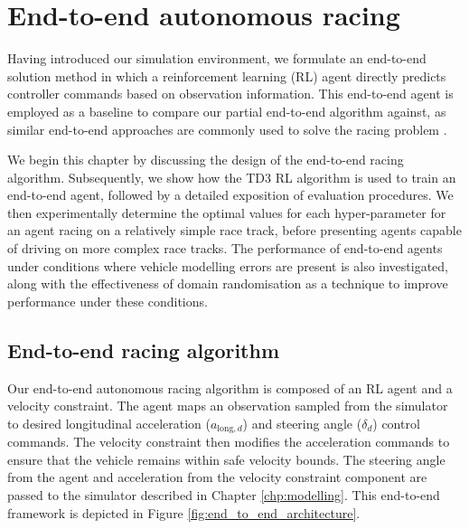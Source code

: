 \chapter{End-to-end autonomous racing}\label{chp:end_to_end_autonomous_racing}

Having introduced our simulation environment, 
we formulate an end-to-end solution method in which a reinforcement learning (RL) agent directly predicts controller commands based on observation information. 
This end-to-end agent is employed as a baseline to compare our partial end-to-end algorithm against, 
as similar end-to-end approaches are commonly used to solve the racing problem \cite{Song2021, Ivanov2020, hsu2022, Schwarting2021, Jaritz2018, Perot2017, Fuchs2021, Niu2020, Remonda2021, Chisari2021, brunnbauer2021}. 

We begin this chapter by discussing the design of the end-to-end racing algorithm.
Subsequently, we show how the TD3 RL algorithm is used to train an end-to-end agent, followed by a detailed exposition of evaluation procedures. 
We then experimentally determine the optimal values for each hyper-parameter for an agent racing on a relatively simple race track, before presenting agents
capable of driving on more complex race tracks.
The performance of end-to-end agents under conditions where vehicle modelling errors are present is also investigated, along with the effectiveness of
domain randomisation as a technique to improve performance under these conditions.






\section{End-to-end racing algorithm}\label{sec:end-to-end_design}

Our end-to-end autonomous racing algorithm is composed of an RL agent and a velocity constraint.
The agent maps an observation sampled from the simulator to desired longitudinal acceleration ($a_{\text{long},d}$) and steering angle ($\delta_d$) control commands.
The velocity constraint then modifies the acceleration commands to ensure that the vehicle remains within safe velocity bounds.
The steering angle from the agent and acceleration from the velocity constraint component are passed to the simulator described in Chapter \ref{chp:modelling}.
This end-to-end framework is depicted in Figure \ref{fig:end_to_end_architecture}. 

